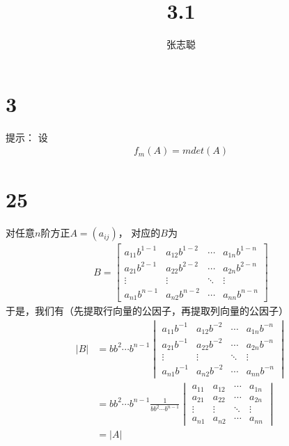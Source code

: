 \documentclass{article}
\begin{document}
\title{3.1}
\author{张志聪}
\maketitle

\section*{3}

提示：
设
\begin{align*}
  f_m(A) = m det(A)
\end{align*}

\section*{25}

对任意$n$阶方正$A = (a_{ij})$，
对应的$B$为
\begin{align*}
  B = \begin{bmatrix}
        a_{11}b^{1-1} & a_{12}b^{1-2} & \cdots & a_{1n}b^{1-n} \\
        a_{21}b^{2-1} & a_{22}b^{2-2} & \cdots & a_{2n}b^{2-n} \\
        \vdots        & \vdots        & \ddots & \vdots        \\
        a_{n1}b^{n-1} & a_{n2}b^{n-2} & \cdots & a_{nn}b^{n-n}
      \end{bmatrix}
\end{align*}
于是，我们有（先提取行向量的公因子，再提取列向量的公因子）
\begin{align*}
  |B| & = b b^2 \cdots b^{n-1} \begin{vmatrix}
                                 a_{11}b^{-1} & a_{12}b^{-2} & \cdots & a_{1n}b^{-n} \\
                                 a_{21}b^{-1} & a_{22}b^{-2} & \cdots & a_{2n}b^{-n} \\
                                 \vdots       & \vdots       & \ddots & \vdots       \\
                                 a_{n1}b^{-1} & a_{n2}b^{-2} & \cdots & a_{nn}b^{-n}
                               \end{vmatrix}             \\
      & = b b^2 \cdots b^{n-1} \frac{1}{b b^2 \cdots b^{n-1}}\begin{vmatrix}
                                                               a_{11} & a_{12} & \cdots & a_{1n} \\
                                                               a_{21} & a_{22} & \cdots & a_{2n} \\
                                                               \vdots & \vdots & \ddots & \vdots \\
                                                               a_{n1} & a_{n2} & \cdots & a_{nn}
                                                             \end{vmatrix} \\
      & = |A|
\end{align*}
\end{document}
